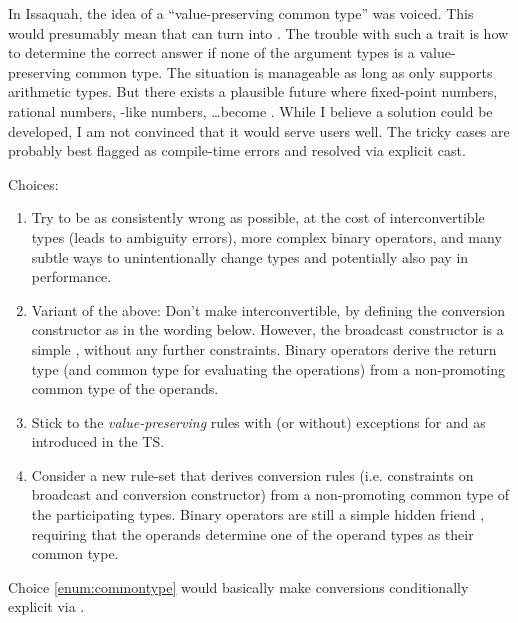 In Issaquah, the idea of a ``value-preserving common type'' was voiced.
This would presumably mean that  can turn into .
The trouble with such a trait is how to determine the correct answer if none of
the argument types is a value-preserving common type.
The situation is manageable as long as  only supports arithmetic types.
But there exists a plausible future where fixed-point numbers, rational numbers,
-like numbers, \ldots become .
While I believe a solution could be developed, I am not convinced that it would
serve users well.
The tricky cases are probably best flagged as compile-time errors and resolved
via explicit cast.

Choices:
\begin{enumerate}
  \item Try to be as consistently wrong as possible, at the cost of
    interconvertible types (leads to ambiguity errors), more complex binary
    operators, and many subtle ways to unintentionally change types and
    potentially also pay in performance.

  \item\label{enum:binaryoptemplates} Variant of the above: Don't make \simd
    interconvertible, by defining the \simd conversion constructor as in the
    wording below.
    However, the broadcast constructor is a simple ,
    without any further constraints.
    Binary operators derive the return type (and common type for evaluating the
    operations) from a non-promoting common type of the operands.

  \item\label{enum:valuepreserving} Stick to the \emph{value-preserving} rules
    with (or without) exceptions for  and  as
    introduced in the TS.

  \item\label{enum:commontype} Consider a new rule-set that derives conversion
    rules (i.e. constraints on broadcast and conversion constructor) from a
    non-promoting common type of the participating types.
    Binary operators are still a simple hidden friend , requiring that the operands determine one of the
    operand types as their common type.
\end{enumerate}

Choice \ref{enum:commontype} would basically make conversions conditionally
explicit via .

